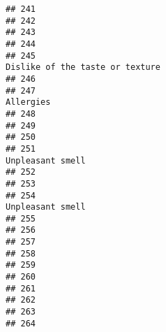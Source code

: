 \documentclass[
]{article}
\begin{document}
\begin{verbatim}
## 241                                                                                                        
## 242                                                                                                        
## 243                                                                                                        
## 244                                                                                                        
## 245                                                                         Dislike of the taste or texture
## 246                                                                                                        
## 247                                                                                               Allergies
## 248                                                                                                        
## 249                                                                                                        
## 250                                                                                                        
## 251                                                                                        Unpleasant smell
## 252                                                                                                        
## 253                                                                                                        
## 254                                                                                        Unpleasant smell
## 255                                                                                                        
## 256                                                                                                        
## 257                                                                                                        
## 258                                                                                                        
## 259                                                                                                        
## 260                                                                                                        
## 261                                                                                                        
## 262                                                                                                        
## 263                                                                                                        
## 264                                                                                                        

\end{verbatim}
\end{document}

